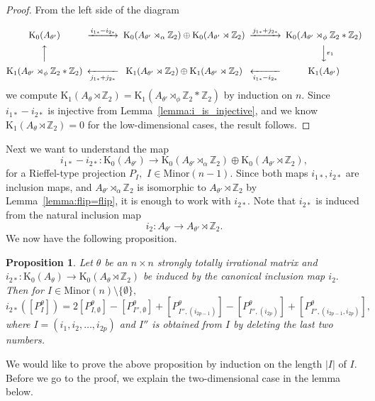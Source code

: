 \documentclass[9pt, BCOR=2mm]{amsart}
\numberwithin{equation}{section}
\numberwithin{equation}{section}
\newtheorem{proposition}[theorem]{Proposition}
\newcommand{\Z}{{\mathbb{Z}}}
\newcommand{\K}{\mathrm{K}} %
\begin{document}
\begin{proof}
	
	From the left side of the diagram
	
		{\small \[
\begin{CD}
\K_0 (A_{\theta'}) @>{i_{1*}-i_{2*}}>>\K_0 (A_{\theta'}\rtimes_\alpha  \Z_2)\oplus \K_0 (A_{\theta'}\rtimes \Z_2)@>{j_{1*}+j_{2*}}>> \K_0 (A_{\theta'}\rtimes_\phi \Z_2*\Z_2)   \\
@A{}AA & &  @VV{e_1}V            \\
 \K_1 (A_{\theta'}\rtimes_\phi \Z_2*\Z_2) @<<{j_{1*}+j_{2*}}<  \K_1 (A_{\theta'}\rtimes \Z_2)\oplus \K_1 (A_{\theta'}\rtimes \Z_2) @<<{i_{1*}-i_{2*}}< \K_1 (A_{\theta'})
\end{CD}
\]}  we compute $\K_1(A_{\theta}\rtimes \Z_2)=  \K_1 (A_{\theta'}\rtimes_\phi \Z_2*\Z_2)$ by induction on $n$. Since $i_{1*}-i_{2*}$ is injective from Lemma~\ref{lemma:i_is_injective}, and we know $\K_1(A_{\theta}\rtimes \Z_2)=0$ for the low-dimensional cases, the result follows. 
\end{proof}


	
	
	Next we want to understand the map $$i_{1*}-i_{2*} :\K_0 (A_{\theta'}) \longrightarrow  \K_0 (A_{\theta'}\rtimes_\alpha  \Z_2)\oplus \K_0 (A_{\theta'}\rtimes \Z_2) ,$$ for a Rieffel-type projection $P_I,$ $I\in \mathrm{Minor}(n-1).$
Since both maps $i_{1*},i_{2*}$ are inclusion maps, and $A_{\theta'}\rtimes_\alpha  \Z_2$ is isomorphic to $A_{\theta'}\rtimes \Z_2$ by Lemma~\ref{lemma:flip=flip}, it is enough to work with $i_{2*}.$ Note that $i_{2*}$ is induced from the natural inclusion map 
$$i_{2} : A_{\theta'}\longrightarrow  A_{\theta'}\rtimes \Z_2.$$
 We now have the following proposition.

\begin{proposition}\label{prop:imageofi_rieffel} Let $\theta$ be an $n \times n$ strongly totally irrational matrix and $i_{2*} : \K_0(A_{\theta})\longrightarrow \K_0(A_{\theta}\rtimes \Z_2)$ be induced by the canonical inclusion map $i_2.$ Then for $I\in \mathrm{Minor}(n)\setminus \{\emptyset\},$
$$i_{2*}([P_I^{\theta}])=	2[P_{I,\emptyset} ^{\theta}]-[P_{I'',\emptyset} ^{\theta}]+[P_{I'',(i_{2p-1})} ^{\theta}]-[P_{I'', (i_{2p})} ^{\theta}]+[P_{I'', (i_{2p-1},i_{2p})} ^{\theta}],$$ where $I=(i_1,i_2,\dots,i_{2p})$ and $I''$ is obtained from $I$ by deleting the last two numbers.
\end{proposition}

We would like to prove the above proposition by induction on the length $|I|$ of $I$. Before we go to the proof, we explain the two-dimensional case in the lemma below. 
\end{document}

